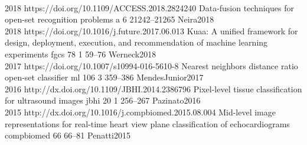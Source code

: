 \begin{publications}
  \\

  {
  }
  {2018}
  {https://doi.org/10.1109/ACCESS.2018.2824240}
  {Data-fusion techniques for open-set recognition problems}
  {a}
  {6}
  {}
  {21242--21265}
  {Neira2018}
  \\

  {
  }
  {2018}
  {https://doi.org/10.1016/j.future.2017.06.013}
  {Kuaa: A unified framework for design, deployment, execution, and recommendation of machine learning experiments}
  {fgcs}
  {78}
  {1}
  {59--76}
  {Werneck2018}
  \\

  {
  }
  {2017}
  {https://doi.org/10.1007/s10994-016-5610-8}
  {Nearest neighbors distance ratio open-set classifier}
  {ml}
  {106}
  {3}
  {359--386}
  {MendesJunior2017}
  \\

  {
  }
  {2016}
  {http://dx.doi.org/10.1109/JBHI.2014.2386796}
  {Pixel-level tissue classification for ultrasound images}
  {jbhi}
  {20}
  {1}
  {256--267}
  {Pazinato2016}
  \\

  {
  }
  {2015}
  {http://dx.doi.org/10.1016/j.compbiomed.2015.08.004}
  {Mid-level image representations for real-time heart view plane classification of echocardiograms}
  {compbiomed}
  {66}
  {}
  {66--81}
  {Penatti2015}
  \\

\end{publications}

